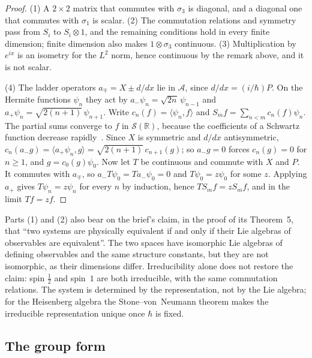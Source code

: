 \documentclass[11pt]{article}
\theoremstyle{definition}
\begin{document}
\begin{proof}
  (1) A $2\times 2$ matrix that commutes with $\sigma_3$ is diagonal, and a diagonal one that
  commutes with $\sigma_1$ is scalar. (2) The commutation relations and symmetry pass from $S_i$
  to $S_i \otimes 1$, and the remaining conditions hold in every finite dimension; finite
  dimension also makes $1 \otimes \sigma_3$ continuous. (3) Multiplication by $e^{ix}$ is an
  isometry for the $L^2$ norm, hence continuous by the remark above, and it is not scalar.

  (4) The ladder operators $a_\mp = X \pm d/dx$ lie in $\mathcal A$, since
  $d/dx = (i/\hbar)P$. On the Hermite functions $\psi_n$ they act by
  $a_-\psi_n = \sqrt{2n}\,\psi_{n-1}$ and $a_+\psi_n = \sqrt{2(n+1)}\,\psi_{n+1}$. Write
  $c_n(f) = \langle\psi_n, f\rangle$ and $S_m f = \sum_{n<m} c_n(f)\psi_n$. The partial sums
  converge to $f$ in $\mathcal S(\mathbb R)$, because the coefficients of a Schwartz function
  decrease rapidly~\cite{simon}. Since $X$ is symmetric and $d/dx$ antisymmetric,
  $c_n(a_- g) = \langle a_+\psi_n, g\rangle = \sqrt{2(n+1)}\,c_{n+1}(g)$; so $a_- g = 0$ forces
  $c_n(g) = 0$ for $n \ge 1$, and $g = c_0(g)\psi_0$. Now let $T$ be continuous and commute with
  $X$ and $P$. It commutes with $a_\mp$, so $a_- T\psi_0 = T a_-\psi_0 = 0$ and
  $T\psi_0 = z\psi_0$ for some $z$. Applying $a_+$ gives $T\psi_n = z\psi_n$ for every $n$ by
  induction, hence $T S_m f = z S_m f$, and in the limit $Tf = zf$.
\end{proof}

Parts (1) and (2) also bear on the brief's claim, in the proof of its Theorem~5, that ``two
systems are physically equivalent if and only if their Lie algebras of observables are
equivalent''. The two spaces have isomorphic Lie algebras of defining observables and the same
structure constants, but they are not isomorphic, as their dimensions differ. Irreducibility
alone does not restore the claim: spin $\frac12$ and spin~$1$ are both irreducible, with the
same commutation relations. The system is determined by the representation, not by the Lie
algebra; for the Heisenberg algebra the Stone--von~Neumann theorem makes the irreducible
representation unique once $\hbar$ is fixed.

\subsection{The group form}
\end{document}
